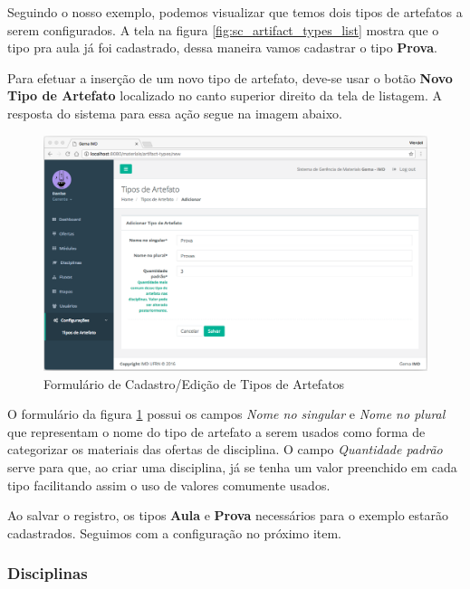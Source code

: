 Seguindo o nosso exemplo, podemos visualizar que temos dois tipos de artefatos a serem configurados. A tela na figura \hyperref[fig:sc_artifact_types_list]{\ref{fig:sc_artifact_types_list}} mostra que o tipo pra aula já foi cadastrado, dessa maneira vamos cadastrar o tipo \textbf{Prova}.

Para efetuar a inserção de um novo tipo de artefato, deve-se usar o botão \textbf{Novo Tipo de Artefato} localizado no canto superior direito da tela de listagem. A resposta do sistema para essa ação segue na imagem abaixo.

\begin{figure}[H]
\centering
     \includegraphics[width=1.0\textwidth]{Screens/ArtifactTypesForm.png}
      \caption{Formulário de Cadastro/Edição de Tipos de Artefatos}
       \label{fig:sc_artifact_types_form}
\end{figure}

O formulário da figura \hyperref[fig:sc_artifact_types_form]{\ref{fig:sc_artifact_types_form}} possui os campos \textit{Nome no singular} e \textit{Nome no plural} que representam o nome do tipo de artefato a serem usados como forma de categorizar os materiais das ofertas de disciplina. O campo \textit{Quantidade padrão} serve para que, ao criar uma disciplina, já se tenha um valor preenchido em cada tipo facilitando assim o uso de valores comumente usados.

Ao salvar o registro, os tipos \textbf{Aula} e \textbf{Prova} necessários para o exemplo estarão cadastrados. Seguimos com a configuração no próximo item.

\subsubsection{Disciplinas}

